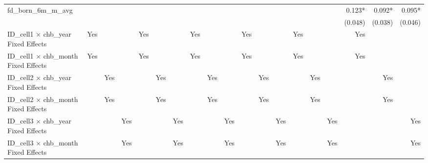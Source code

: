 \begin{tabular}{lrrrrrrrrrrrrrrrrrr}
fd\_born\_6m\_m\_avg                        &             &             &             &             &             &             &             &             &             &             &             &             &             &             &             &      0.123* &      0.092* &      0.095* \\ 
                                            &             &             &             &             &             &             &             &             &             &             &             &             &             &             &             &     (0.048) &     (0.038) &     (0.046) \\ 
\midrule
ID\_cell1 $\times$ chb\_year Fixed Effects  &         Yes &             &             &         Yes &             &             &         Yes &             &             &         Yes &             &             &         Yes &             &             &         Yes &             &             \\ 
ID\_cell1 $\times$ chb\_month Fixed Effects &         Yes &             &             &         Yes &             &             &         Yes &             &             &         Yes &             &             &         Yes &             &             &         Yes &             &             \\ 
ID\_cell2 $\times$ chb\_year Fixed Effects  &             &         Yes &             &             &         Yes &             &             &         Yes &             &             &         Yes &             &             &         Yes &             &             &         Yes &             \\ 
ID\_cell2 $\times$ chb\_month Fixed Effects &             &         Yes &             &             &         Yes &             &             &         Yes &             &             &         Yes &             &             &         Yes &             &             &         Yes &             \\ 
ID\_cell3 $\times$ chb\_year Fixed Effects  &             &             &         Yes &             &             &         Yes &             &             &         Yes &             &             &         Yes &             &             &         Yes &             &             &         Yes \\ 
ID\_cell3 $\times$ chb\_month Fixed Effects &             &             &         Yes &             &             &         Yes &             &             &         Yes &             &             &         Yes &             &             &         Yes &             &             &         Yes \\ 

\end{tabular}
